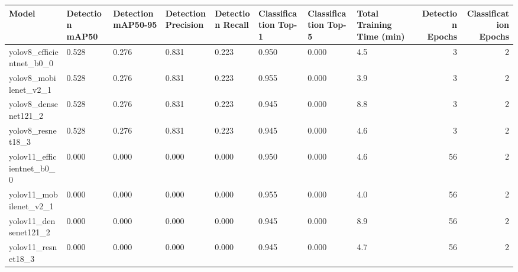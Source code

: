 \begin{tabular}{llllllllrr}
\toprule
Model & Detection mAP50 & Detection mAP50-95 & Detection Precision & Detection Recall & Classification Top-1 & Classification Top-5 & Total Training Time (min) & Detection Epochs & Classification Epochs \\
\midrule
yolov8_efficientnet_b0_0 & 0.528 & 0.276 & 0.831 & 0.223 & 0.950 & 0.000 & 4.5 & 3 & 2 \\
yolov8_mobilenet_v2_1 & 0.528 & 0.276 & 0.831 & 0.223 & 0.955 & 0.000 & 3.9 & 3 & 2 \\
yolov8_densenet121_2 & 0.528 & 0.276 & 0.831 & 0.223 & 0.945 & 0.000 & 8.8 & 3 & 2 \\
yolov8_resnet18_3 & 0.528 & 0.276 & 0.831 & 0.223 & 0.945 & 0.000 & 4.6 & 3 & 2 \\
yolov11_efficientnet_b0_0 & 0.000 & 0.000 & 0.000 & 0.000 & 0.950 & 0.000 & 4.6 & 56 & 2 \\
yolov11_mobilenet_v2_1 & 0.000 & 0.000 & 0.000 & 0.000 & 0.955 & 0.000 & 4.0 & 56 & 2 \\
yolov11_densenet121_2 & 0.000 & 0.000 & 0.000 & 0.000 & 0.945 & 0.000 & 8.9 & 56 & 2 \\
yolov11_resnet18_3 & 0.000 & 0.000 & 0.000 & 0.000 & 0.945 & 0.000 & 4.7 & 56 & 2 \\
\bottomrule
\end{tabular}
